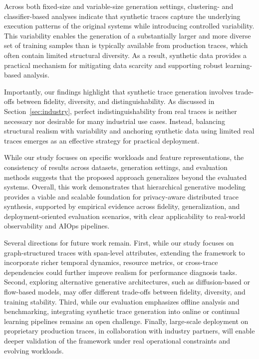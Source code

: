 \documentclass[sigconf,review]{acmart}
\begin{document}
Across both fixed-size and variable-size generation settings, clustering- and classifier-based analyses indicate that synthetic traces capture the underlying execution patterns of the original systems while introducing controlled variability. This variability enables the generation of a substantially larger and more diverse set of training samples than is typically available from production traces, which often contain limited structural diversity. As a result, synthetic data provides a practical mechanism for mitigating data scarcity and supporting robust learning-based analysis.

Importantly, our findings highlight that synthetic trace generation involves trade-offs between fidelity, diversity, and distinguishability. As discussed in Section~\ref{sec:industry}, perfect indistinguishability from real traces is neither necessary nor desirable for many industrial use cases. Instead, balancing structural realism with variability and anchoring synthetic data using limited real traces emerges as an effective strategy for practical deployment.

While our study focuses on specific workloads and feature representations, the consistency of results across datasets, generation settings, and evaluation methods suggests that the proposed approach generalizes beyond the evaluated systems. Overall, this work demonstrates that hierarchical generative modeling provides a viable and scalable foundation for privacy-aware distributed trace synthesis, supported by empirical evidence across fidelity, generalization, and deployment-oriented evaluation scenarios, with clear applicability to real-world observability and AIOps pipelines.

Several directions for future work remain. First, while our study focuses on graph-structured traces with span-level attributes, extending the framework to incorporate richer temporal dynamics, resource metrics, or cross-trace dependencies could further improve realism for performance diagnosis tasks. Second, exploring alternative generative architectures, such as diffusion-based or flow-based models, may offer different trade-offs between fidelity, diversity, and training stability. Third, while our evaluation emphasizes offline analysis and benchmarking, integrating synthetic trace generation into online or continual learning pipelines remains an open challenge. Finally, large-scale deployment on proprietary production traces, in collaboration with industry partners, will enable deeper validation of the framework under real operational constraints and evolving workloads.


% 
% 

% 

\end{document}
